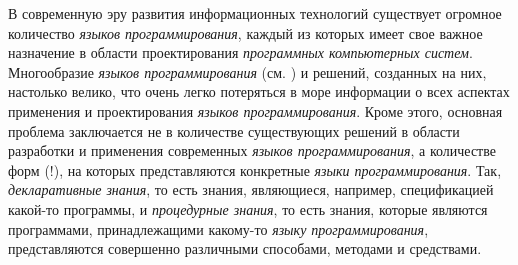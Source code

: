 В современную эру развития информационных технологий существует огромное количество \textit{языков программирования}, каждый из которых имеет свое важное назначение в области проектирования \textit{программных компьютерных систем}. Многообразие \textit{языков программирования} (см. ) и решений, созданных на них, настолько велико, что очень легко потеряться в море информации о всех аспектах применения и проектирования \textit{языков программирования}. Кроме этого, основная проблема заключается не в количестве существующих решений в области разработки и применения современных \textit{языков программирования}, а количестве форм (!), на которых представляются конкретные \textit{языки программирования}. Так, \textit{декларативные знания}, то есть знания, являющиеся, например, спецификацией какой-то программы, и \textit{процедурные знания}, то есть знания, которые являются программами, принадлежащими какому-то \textit{языку программирования}, представляются совершенно различными способами, методами и средствами.


